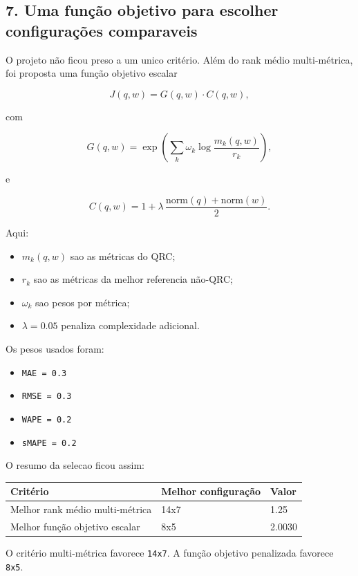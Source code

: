 \documentclass[12pt]{article}
\providecommand{\tightlist}{%
          \setlength{\itemsep}{0pt}\setlength{\parskip}{0pt}}
\begin{document}
\subsection{7. Uma função objetivo para escolher configurações comparaveis}\label{7-uma-funuxe7uxe3o-objetivo-para-escolher-configurauxe7uxf5es-comparaveis}

O projeto não ficou preso a um unico critério. Além do rank médio multi-métrica, foi proposta uma função objetivo escalar

\[
J(q, w) = G(q, w) \cdot C(q, w),
\]

com

\[
G(q, w) = \exp\left(\sum_k \omega_k \log\frac{m_k(q, w)}{r_k}\right),
\]

e

\[
C(q, w) = 1 + \lambda \, \frac{\mathrm{norm}(q) + \mathrm{norm}(w)}{2}.
\]

Aqui:

\begin{itemize}
\tightlist
\item
  \(m_k(q, w)\) sao as métricas do QRC;
\item
  \(r_k\) sao as métricas da melhor referencia não-QRC;
\item
  \(\omega_k\) sao pesos por métrica;
\item
  \(\lambda = 0.05\) penaliza complexidade adicional.
\end{itemize}

Os pesos usados foram:

\begin{itemize}
\tightlist
\item
  \texttt{MAE\ =\ 0.3}
\item
  \texttt{RMSE\ =\ 0.3}
\item
  \texttt{WAPE\ =\ 0.2}
\item
  \texttt{sMAPE\ =\ 0.2}
\end{itemize}

O resumo da selecao ficou assim:

\begin{longtable}[]{@{}lll@{}}
\toprule\noalign{}
Critério & Melhor configuração & Valor \\
\midrule\noalign{}
\endhead
\bottomrule\noalign{}
\endlastfoot
Melhor rank médio multi-métrica & 14x7 & 1.25 \\
Melhor função objetivo escalar & 8x5 & 2.0030 \\
\end{longtable}

O critério multi-métrica favorece \texttt{14x7}. A função objetivo penalizada favorece \texttt{8x5}.
\end{document}
